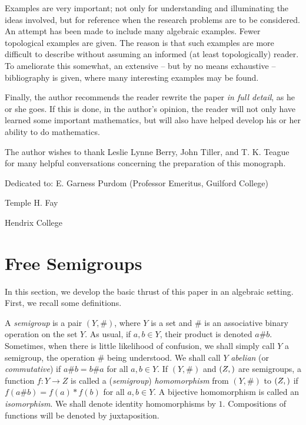 \documentclass{article}
\begin{document}
Examples are very important; not only for understanding and illuminating the ideas involved, but for reference when the research problems are to be considered. An attempt has been made to include many algebraic examples. Fewer topological examples are given. The reason is that such examples are more difficult to describe without assuming an informed (at least topologically) reader. To ameliorate this somewhat, an extensive -- but by no means exhaustive -- bibliography is given, where many interesting examples may be found.

Finally, the author recommends the reader rewrite the paper \emph{in full detail}, as he or she goes. If this is done, in the author's opinion, the reader will not only have learned some important mathematics, but will also have helped develop his or her ability to do mathematics.

The author wishes to thank Leslie Lynne Berry, John Tiller, and T. K. Teague for many helpful conversations concerning the preparation of this monograph.

Dedicated to: E. Garness Purdom (Professor Emeritus, Guilford College)

\begin{flushright}
Temple H. Fay

Hendrix College
\end{flushright}


\newpage

\section{Free Semigroups}


In this section, we develop the basic thrust of this paper in an algebraic setting. First, we recall some definitions.

A \emph{semigroup} is a pair $(Y, \#)$, where $Y$ is a set and $\#$ is an associative binary operation on the set $Y$. As usual, if $a,b \in Y$, their product is denoted $a\#b$. Sometimes, when there is little likelihood of confusion, we shall simply call $Y$ a semigroup, the operation $\#$ being understood. We shall call $Y$ \emph{abelian} (or \emph{commutative}) if $a\#b = b\#a$ for all $a,b \in Y$. If $(Y,\#)$ and $(Z,\*)$ are semigroups, a function $f: Y \rightarrow Z$ is called a (\emph{semigroup}) \emph{homomorphism} from $(Y,\#)$ to $(Z,\*)$ if $f(a\#b) = f(a) * f(b)$ for all $a,b \in Y$. A bijective homomorphism is called an \emph{isomorphism}. We shall denote identity homomorphisms by $1$. Compositions of functions will be denoted by juxtaposition.
\end{document}
